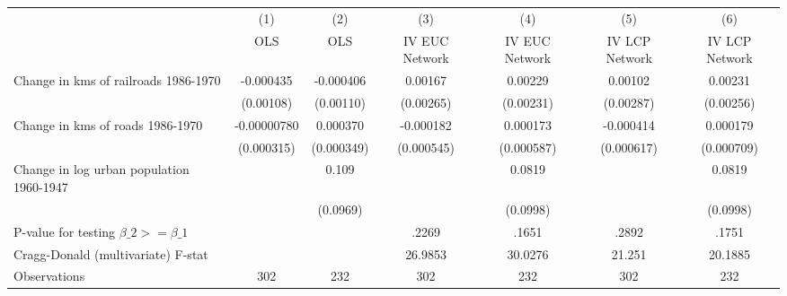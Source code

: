 {
\def\sym#1{\ifmmode^{#1}\else\(^{#1}\)\fi}
\begin{tabular}{l*{6}{c}}
\hline\hline
                &\multicolumn{1}{c}{(1)}&\multicolumn{1}{c}{(2)}&\multicolumn{1}{c}{(3)}&\multicolumn{1}{c}{(4)}&\multicolumn{1}{c}{(5)}&\multicolumn{1}{c}{(6)}\\
                &\multicolumn{1}{c}{OLS}&\multicolumn{1}{c}{OLS}&\multicolumn{1}{c}{IV EUC Network}&\multicolumn{1}{c}{IV EUC Network}&\multicolumn{1}{c}{IV LCP Network}&\multicolumn{1}{c}{IV LCP Network}\\
\hline
Change in kms of railroads 1986-1970&-0.000435         &-0.000406         &  0.00167         &  0.00229         &  0.00102         &  0.00231         \\
                &(0.00108)         &(0.00110)         &(0.00265)         &(0.00231)         &(0.00287)         &(0.00256)         \\
[1em]
Change in kms of roads 1986-1970&-0.00000780         & 0.000370         &-0.000182         & 0.000173         &-0.000414         & 0.000179         \\
                &(0.000315)         &(0.000349)         &(0.000545)         &(0.000587)         &(0.000617)         &(0.000709)         \\
[1em]
Change in log urban population 1960-1947&                  &    0.109         &                  &   0.0819         &                  &   0.0819         \\
                &                  & (0.0969)         &                  & (0.0998)         &                  & (0.0998)         \\
\hline
P-value for testing $\beta\_{2} >= \beta\_{1}$&                  &                  &    .2269         &    .1651         &    .2892         &    .1751         \\
Cragg-Donald (multivariate) F-stat&                  &                  &  26.9853         &  30.0276         &   21.251         &  20.1885         \\
Observations    &      302         &      232         &      302         &      232         &      302         &      232         \\
\hline\hline
\end{tabular}
}
